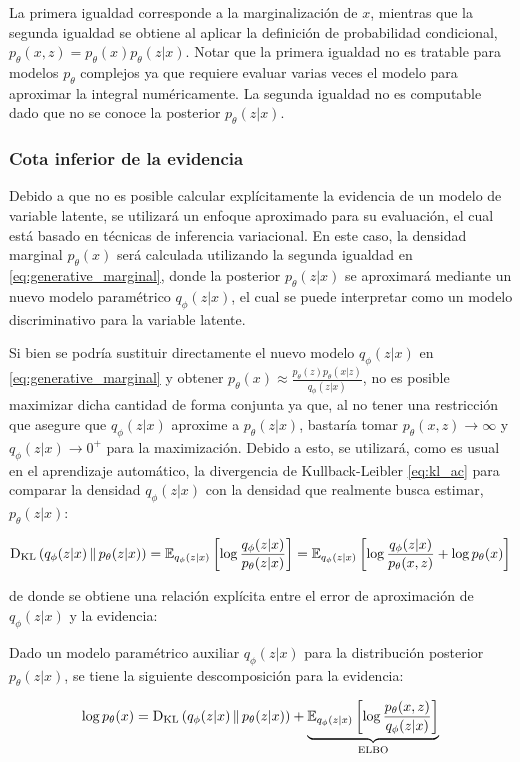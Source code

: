 La primera igualdad corresponde a la marginalización de $x$, mientras que la segunda igualdad se obtiene al aplicar la definición de probabilidad condicional, $p_\theta(x,z)=p_\theta(x)p_\theta(z|x)$. Notar que la primera igualdad no es tratable para modelos $p_\theta$ complejos ya que requiere evaluar varias veces el modelo para aproximar la integral numéricamente. La segunda igualdad no es computable dado que no se conoce la posterior $p_\theta(z|x)$.

\subsubsection{Cota inferior de la evidencia}

Debido a que no es posible calcular explícitamente la evidencia de un modelo de variable latente, se utilizará un enfoque aproximado para su evaluación, el cual está basado en técnicas de inferencia variacional. En este caso, la densidad marginal $p_\theta(x)$ será calculada utilizando la segunda igualdad en \eqref{eq:generative_marginal}, donde la posterior $p_\theta(z|x)$ se aproximará mediante un nuevo modelo paramétrico $q_\phi(z|x)$, el cual se puede interpretar como un modelo discriminativo para la variable latente.

Si bien se podría sustituir directamente el nuevo modelo $q_\phi(z|x)$ en \eqref{eq:generative_marginal} y obtener $p_\theta(x)\approx\frac{p_\theta(z)p_\theta(x|z)}{q_\phi(z|x)}$, no es posible maximizar dicha cantidad de forma conjunta ya que, al no tener una restricción que asegure que $q_\phi(z|x)$ aproxime a $p_\theta(z|x)$, bastaría tomar $p_\theta(x,z)\to\infty$ y $q_\phi(z|x)\to 0^+$ para la maximización. Debido a esto, se utilizará, como es usual en el aprendizaje automático, la divergencia de Kullback-Leibler \eqref{eq:kl_ac} para comparar la densidad $q_\phi(z|x)$ con la densidad que realmente busca estimar, $p_\theta(z|x)$:

\begin{equation*}
    \operatorname{D_{KL}}\left(q_\phi(z|x)\,\|\,p_\theta(z|x)\right)
    = \mathbb{E}_{q_\phi(z|x)}\left[\log\frac{q_\phi(z|x)}{p_\theta(z|x)}\right]
    = \mathbb{E}_{q_\phi(z|x)}\left[\log\frac{q_\phi(z|x)}{p_\theta(x,z)} + \log p_\theta(x)\right]
\end{equation*}

de donde se obtiene una relación explícita entre el error de aproximación de $q_\phi(z|x)$ y la evidencia:

\begin{prop}
    Dado un modelo paramétrico auxiliar $q_\phi(z|x)$ para la distribución posterior $p_\theta(z|x)$, se tiene la siguiente descomposición para la evidencia:

    \begin{equation}
        \label{eq:evidence_decomposition}
        \log p_\theta(x)
        = \operatorname{D_{KL}}\left(q_\phi(z|x)\,\|\,p_\theta(z|x)\right) + \underbrace{\mathbb{E}_{q_\phi(z|x)}\left[\log\frac{p_\theta(x,z)}{q_\phi(z|x)}\right]}_{\operatorname{ELBO}}
    \end{equation}
\end{prop}

